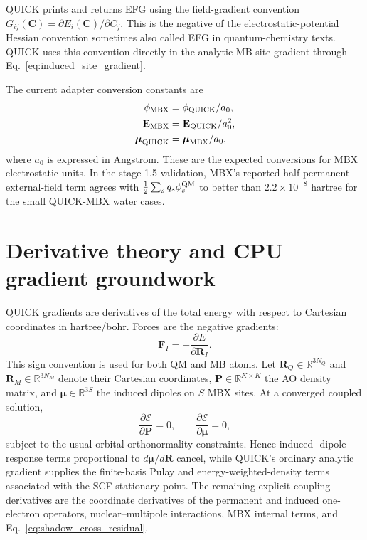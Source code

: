 \documentclass[11pt]{article}
\begin{document}
QUICK prints and returns EFG using the field-gradient convention
$G_{ij}(\mathbf{C})=\partial E_i(\mathbf{C})/\partial C_j$. This is the
negative of the electrostatic-potential Hessian convention sometimes also
called EFG in quantum-chemistry texts. QUICK uses this convention directly
in the analytic MB-site gradient through
Eq.~\ref{eq:induced_site_gradient}.

The current adapter conversion constants are
\begin{align}
  \phi_{\rm MBX} &= \phi_{\rm QUICK}/a_0,\\
  \mathbf{E}_{\rm MBX} &= \mathbf{E}_{\rm QUICK}/a_0^2,\\
  \boldsymbol{\mu}_{\rm QUICK} &= \boldsymbol{\mu}_{\rm MBX}/a_0,
\end{align}
where $a_0$ is expressed in Angstrom. These are the expected conversions
for MBX electrostatic units. In the stage-1.5 validation, MBX's reported
half-permanent external-field term agrees with
$\frac{1}{2}\sum_s q_s\phi^{\rm QM}_s$ to better than $2.2\times 10^{-8}$
hartree for the small QUICK-MBX water cases.

\section{Derivative theory and CPU gradient groundwork}

QUICK gradients are derivatives of the total energy with respect to
Cartesian coordinates in hartree/bohr. Forces are the negative gradients:
\begin{equation}
  \mathbf{F}_I=-\frac{\partial E}{\partial \mathbf{R}_I}.
\end{equation}
This sign convention is used for both QM and MB atoms. Let
$\mathbf{R}_Q\in\mathbb{R}^{3N_Q}$ and
$\mathbf{R}_M\in\mathbb{R}^{3N_M}$ denote their Cartesian coordinates,
$\mathbf{P}\in\mathbb{R}^{K\times K}$ the AO density matrix, and
$\boldsymbol{\mu}\in\mathbb{R}^{3S}$ the induced dipoles on $S$ MBX
sites. At a converged coupled solution,
\begin{equation}
  \frac{\partial\mathcal{E}}{\partial\mathbf{P}}=0,
  \qquad
  \frac{\partial\mathcal{E}}{\partial\boldsymbol{\mu}}=0,
  \label{eq:coupled_stationarity}
\end{equation}
subject to the usual orbital orthonormality constraints. Hence induced-
dipole response terms proportional to
$d\boldsymbol{\mu}/d\mathbf{R}$ cancel, while QUICK's ordinary analytic
gradient supplies the finite-basis Pulay and energy-weighted-density
terms associated with the SCF stationary point. The remaining explicit
coupling derivatives are the coordinate derivatives of the permanent and
induced one-electron operators, nuclear--multipole interactions, MBX
internal terms, and Eq.~\ref{eq:shadow_cross_residual}.
\end{document}
